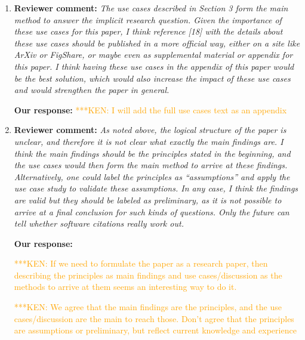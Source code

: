\documentclass{article}
\newcommand{\katznote}[1]{ {\textcolor{blue} { ***DSK: #1 }}} %
\newcommand{\niemnote}[1]{ {\textcolor{orange} { ***KEN: #1 }}} %
\begin{document}
\begin{enumerate}
\niemnote{Let's say that}
We agree that this paper is more of a position paper than research article, and thus that creating a research question would be an artificial construct. We are willing to make this change if required, but feel it wouldn't add much to the paper.
\katznote{and maybe add}
We have modeled our process on the work done by the FORCE2016 Data Citation group, which included publishing a PeerJ CS paper (\url{https://peerj.com/articles/cs-1/}) which has been written in a similar manner to our paper.

\item \textbf{Reviewer comment:}
\emph{The use cases described in Section 3 form the main method to answer the implicit research question. Given the importance of these use cases for this paper, I think reference [18] with the details about these use cases should be published in a more official way, either on a site like ArXiv or FigShare, or maybe even as supplemental material or appendix for this paper. I think having these use cases in the appendix of this paper would be the best solution, which would also increase the impact of these use cases and would strengthen the paper in general.}

\textbf{Our response:}
\niemnote{I will add the full use cases text as an appendix}


\item \textbf{Reviewer comment:}
\emph{As noted above, the logical structure of the paper is unclear, and therefore it is not clear what exactly the main findings are. I think the main findings should be the principles stated in the beginning, and the use cases would then form the main method to arrive at these findings. Alternatively, one could label the principles as ``assumptions'' and apply the use case study to validate these assumptions. In any case, I think the findings are valid but they should be labeled as preliminary, as it is not possible to arrive at a final conclusion for such kinds of questions. Only the future can tell whether software citations really work out.}

\textbf{Our response:}

\niemnote{If we need to formulate the paper as a research paper, then describing the principles as main findings and use cases\slash discussion as the methods to arrive at them seems an interesting way to do it.}

\niemnote{We agree that the main findings are the principles, and the use cases/discussion are the main to reach those.  Don't agree that the principles are assumptions or preliminary, but reflect current knowledge and experience}


\end{enumerate}
\end{document}

